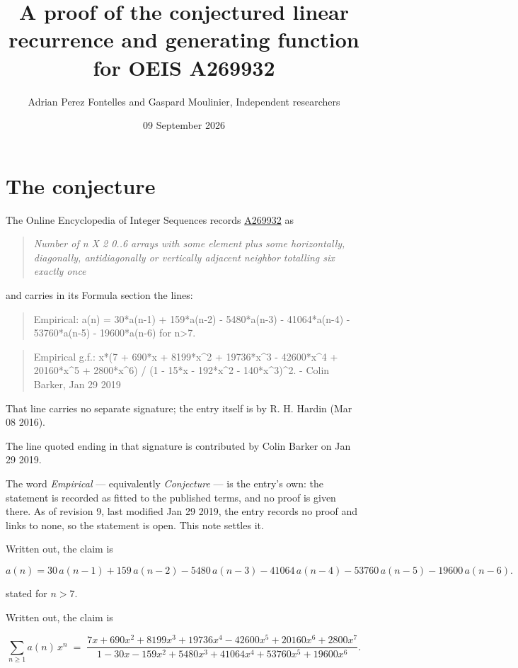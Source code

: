 \documentclass[11pt]{article}
\title{A proof of the conjectured linear recurrence and generating function for OEIS A269932}
\author{Adrian Perez Fontelles and Gaspard Moulinier, Independent researchers}
\date{09 September 2026}
\theoremstyle{definition}
\begin{document}
\maketitle
\section{The conjecture}

The Online Encyclopedia of Integer Sequences records \href{https://oeis.org/A269932}{A269932} as

\begin{quote}\itshape Number of n X 2 0..6 arrays with some element plus some horizontally, diagonally, antidiagonally or vertically adjacent neighbor totalling six exactly once\end{quote}

and carries in its Formula section the lines:

\begin{quote}\ttfamily Empirical: a(n) = 30*a(n-1) + 159*a(n-2) - 5480*a(n-3) - 41064*a(n-4) - 53760*a(n-5) - 19600*a(n-6) for n>7.\end{quote}

\begin{quote}\ttfamily Empirical g.f.: x*(7 + 690*x + 8199*x\textasciicircum{}2 + 19736*x\textasciicircum{}3 - 42600*x\textasciicircum{}4 + 20160*x\textasciicircum{}5 + 2800*x\textasciicircum{}6) / (1 - 15*x - 192*x\textasciicircum{}2 - 140*x\textasciicircum{}3)\textasciicircum{}2. - Colin Barker, Jan 29 2019\end{quote}

That line carries no separate signature; the entry itself is by R. H. Hardin (Mar 08 2016).

The line quoted ending in that signature is contributed by Colin Barker on Jan 29 2019.

The word {\itshape Empirical} --- equivalently {\itshape Conjecture} --- is the entry's own: the statement is recorded as fitted to the published terms, and no proof is given there. As of revision 9, last modified Jan 29 2019, the entry records no proof and links to none, so the statement is open. This note settles it.

Written out, the claim is

\[a(n) = 30\,a(n-1) + 159\,a(n-2) - 5480\,a(n-3) - 41064\,a(n-4) - 53760\,a(n-5) - 19600\,a(n-6).\]

stated for $n > 7$.

Written out, the claim is

\[\sum_{n \ge 1} a(n)\,x^n \;=\; \frac{7x + 690x^{2} + 8199x^{3} + 19736x^{4} - 42600x^{5} + 20160x^{6} + 2800x^{7}}{1 - 30x - 159x^{2} + 5480x^{3} + 41064x^{4} + 53760x^{5} + 19600x^{6}}.\]
\end{document}
